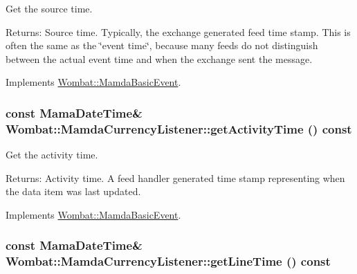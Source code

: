Get the source time. 

\begin{Desc}
\item[Returns:]Source time. Typically, the exchange generated feed time stamp. This is often the same as the \char`\"{}event time\char`\"{}, because many feeds do not distinguish between the actual event time and when the exchange sent the message. \end{Desc}


Implements \hyperlink{classWombat_1_1MamdaBasicEvent_60b5d51f3799c4762090505ef5b213e9}{Wombat::Mamda\-Basic\-Event}.\hypertarget{classWombat_1_1MamdaCurrencyListener_3d35c47919af62b2900d2c560b66d898}{
\subsubsection[getActivityTime]{\setlength{\rightskip}{0pt plus 5cm}const Mama\-Date\-Time\& Wombat::Mamda\-Currency\-Listener::get\-Activity\-Time () const}}
\label{classWombat_1_1MamdaCurrencyListener_3d35c47919af62b2900d2c560b66d898}


Get the activity time. 

\begin{Desc}
\item[Returns:]Activity time. A feed handler generated time stamp representing when the data item was last updated. \end{Desc}


Implements \hyperlink{classWombat_1_1MamdaBasicEvent_b3810afc69474ef3b192ee4c9307e714}{Wombat::Mamda\-Basic\-Event}.\hypertarget{classWombat_1_1MamdaCurrencyListener_1f9fa224749c87c92668bf55bcb2cfa5}{
\subsubsection[getLineTime]{\setlength{\rightskip}{0pt plus 5cm}const Mama\-Date\-Time\& Wombat::Mamda\-Currency\-Listener::get\-Line\-Time () const}}
\label{classWombat_1_1MamdaCurrencyListener_1f9fa224749c87c92668bf55bcb2cfa5}


